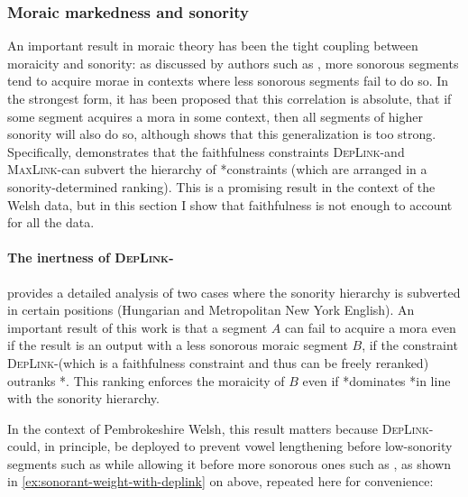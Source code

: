 \subsubsection{Moraic markedness and sonority}
\label{sec:role-sonority}

An important result in moraic theory has been the tight coupling between moraicity and sonority: as discussed by authors such as \citet{zec88:_sonor,zec95,ot,moren00:_kashm,moren01:_distin,gordon06:_syllab,delacy2002,delacy2006}, more sonorous segments tend to acquire morae in contexts where less sonorous segments fail to do so. In the strongest form, it has been proposed \citep[\egm][]{zec88:_sonor} that this correlation is absolute, \ie that if some segment acquires a mora in some context, then all segments of higher sonority will also do so, although \citet{moren01:_distin} shows that this generalization is too strong. Specifically, \citet{moren01:_distin} demonstrates that the faithfulness constraints \textsc{DepLink}-\mo and \textsc{MaxLink}-\mo can subvert the hierarchy of *\mo constraints (which are arranged in a sonority\hyp determined ranking). This is a promising result in the context of the Welsh data, but in this section I show that faithfulness is not enough to account for all the data.

\paragraph{The inertness of \textsc{DepLink}-\mo}
\label{sec:inertn-textscd-mo}

\citet{moren01:_distin} provides a detailed analysis of two cases where the sonority hierarchy is subverted in certain positions (Hungarian and Metropolitan New York English). An important result of this work is that a segment $A$ can fail to acquire a mora even if the result is an output with a less sonorous moraic segment $B$, if the constraint \textsc{DepLink}-\mo[A] (which is a faithfulness constraint and thus can be freely reranked) outranks *\mo[B]. This ranking enforces the moraicity of $B$ even if *\mo[B] dominates *\mo[A] in line with the sonority hierarchy.

In the context of Pembrokeshire Welsh, this result matters because \textsc{DepLink}-\mo could, in principle, be deployed to prevent vowel lengthening before low\hyp sonority segments such as \ipa{[p~t~k]} while allowing it before more sonorous ones such as \ipa{[b~d~ɡ]}, as shown in \ref{ex:sonorant-weight-with-deplink} on  above, repeated here for convenience:

